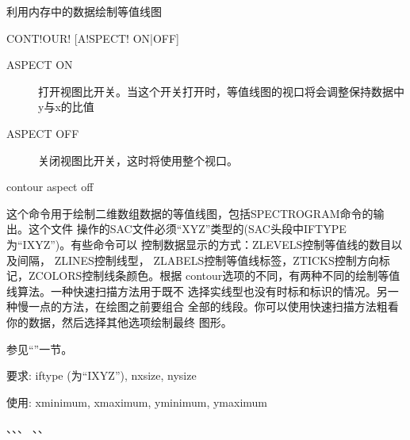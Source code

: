 \label{cmd:contour}

利用内存中的数据绘制等值线图

\begin{SACSTX}
CONT!OUR! [A!SPECT! ON|OFF]
\end{SACSTX}

\begin{description}
\item [ASPECT ON] 打开视图比开关。当这个开关打开时，等值线图的视口将会调整保持数据中y与x的比值
\item [ASPECT OFF] 关闭视图比开关，这时将使用整个视口。
\end{description}

\begin{SACDFT}
contour  aspect  off
\end{SACDFT}

这个命令用于绘制二维数组数据的等值线图，包括SPECTROGRAM命令的输出。这个文件
操作的SAC文件必须``XYZ''类型的(SAC头段中IFTYPE为``IXYZ'')。有些命令可以
控制数据显示的方式：ZLEVELS控制等值线的数目以及间隔， ZLINES控制线型，
ZLABELS控制等值线标签，ZTICKS控制方向标记，ZCOLORS控制线条颜色。根据
contour选项的不同，有两种不同的绘制等值线算法。一种快速扫描方法用于既不
选择实线型也没有时标和标识的情况。另一种慢一点的方法，在绘图之前要组合
全部的线段。你可以使用快速扫描方法粗看你的数据，然后选择其他选项绘制最终
图形。

参见``''一节。

要求: iftype (为``IXYZ''), nxsize, nysize

使用: xminimum, xmaximum, yminimum, ymaximum

、、、
、、

